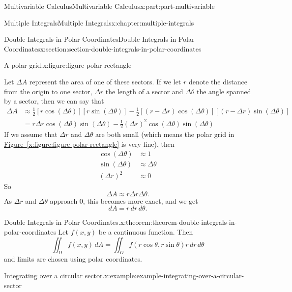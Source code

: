 \documentclass[twoside,10pt,]{book}
\newcommand{\xreffont}{\relax}
\numberwithin{equation}{part}
\begin{document}
\begin{partptx}{Multivariable Calculus}{}{Multivariable Calculus}{}{}{x:part:part-multivariable}
\begin{chapterptx}{Multiple Integrals}{}{Multiple Integrals}{}{}{x:chapter:multiple-integrals}
\begin{sectionptx}{Double Integrals in Polar Coordinates}{}{Double Integrals in Polar Coordinates}{}{}{x:section:section-double-integrals-in-polar-coordinates}
\begin{figureptx}{A polar grid.}{x:figure:figure-polar-rectangle}{}
\begin{image}{0}{1}{0}
{
}%
\end{image}%
\tcblower
\end{figureptx}%
%
\par
Let \(\Delta A\) represent the area of one of these sectors. If we let \(r\) denote the distance from the origin to one sector, \(\Delta r\) the length of a sector and \(\Delta\theta\) the angle spanned by a sector, then we can say that%
\begin{align*}
\Delta A & \approx \frac{1}{2}[r\cos(\Delta\theta)][r\sin(\Delta\theta)] - \frac{1}{2}[(r-\Delta r)\cos(\Delta\theta)][(r-\Delta r)\sin(\Delta\theta)] \\
& = r\Delta r\cos(\Delta\theta)\sin(\Delta\theta) - \frac{1}{2}(\Delta r)^{2}\cos(\Delta\theta)\sin(\Delta\theta)
\end{align*}
If we assume that \(\Delta r\) and \(\Delta\theta\) are both small (which means the polar grid in \hyperref[x:figure:figure-polar-rectangle]{Figure~{\xreffont\ref{x:figure:figure-polar-rectangle}}} is very fine), then%
\begin{align*}
\cos(\Delta\theta) & \approx 1 \\
\sin(\Delta\theta) & \approx \Delta\theta \\
(\Delta r)^{2} & \approx 0 
\end{align*}
So%
\begin{equation*}
\Delta A \approx r\Delta r\Delta\theta\text{.}
\end{equation*}
As \(\Delta r\) and \(\Delta\theta\) approach \(0\), this becomes more exact, and we get%
\begin{equation*}
dA = r\,dr\,d\theta\text{.}
\end{equation*}
%
\begin{theorem}{Double Integrals in Polar Coordinates.}{}{x:theorem:theorem-double-integrals-in-polar-coordinates}%
%
Let \(f(x,y)\) be a continuous function. Then%
\begin{equation*}
\iint_{D}f(x,y)\,dA = \iint_{D}f(r\cos\theta,r\sin\theta)r\,dr\,d\theta
\end{equation*}
and limits are chosen using polar coordinates.%
\end{theorem}
\begin{example}{Integrating over a circular sector.}{x:example:example-integrating-over-a-circular-sector}%

\end{example}
\end{sectionptx}
\end{chapterptx}
\end{partptx}
\end{document}
